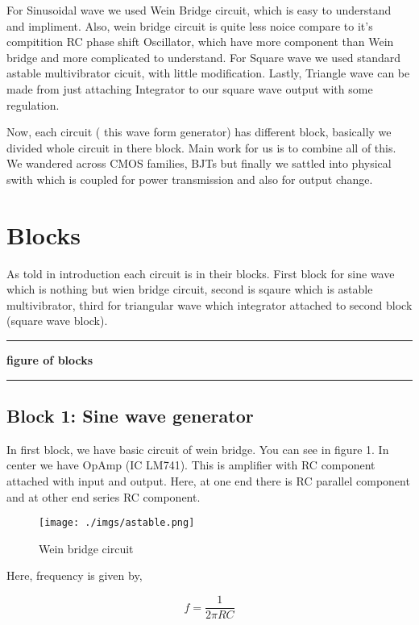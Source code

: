 \documentclass{article}
\begin{document}
For Sinusoidal wave we used Wein Bridge circuit, which is easy to understand and impliment. Also, wein bridge circuit is quite less noice compare to it's compitition RC phase shift Oscillator, which have more component than Wein bridge and more complicated to understand. For Square wave we used standard astable multivibrator cicuit, with little modification. Lastly, Triangle wave can be made from just attaching Integrator to our square wave output with some regulation.

Now, each circuit ( this wave form generator) has different block, basically we divided whole circuit in there block. Main work for us is to combine all of this. We wandered across CMOS families, BJTs but finally we sattled into physical swith which is coupled for power transmission and also for output change.

\section{Blocks}
\label{sec:orgefd5cff}


As told in introduction each circuit is in their blocks. First block for sine wave which is nothing but wien bridge circuit, second is sqaure which is astable multivibrator, third for triangular wave which integrator attached to second block (square wave block).

\noindent\rule{\textwidth}{0.5pt}
\textbf{\textbf{figure of blocks}}

\noindent\rule{\textwidth}{0.5pt}

\subsection{Block 1: Sine wave generator}
\label{sec:org53a1277}


In first block, we have basic circuit of wein bridge. You can see in figure 1. In center we have OpAmp (IC LM741). This is amplifier with RC component attached with input and output. Here, at one end there is RC parallel component and at other end series RC component. 

\begin{figure}[htbp]
\centering
\texttt{[image: ./imgs/astable.png]}
\caption{\label{fig:org54c7d59}Wein bridge circuit}
\end{figure}

Here, frequency is given by, 

\begin{equation}
\label{eq:org72a0a60}
  f =\frac{1}{2 \pi RC}
\end{equation}
\end{document}
